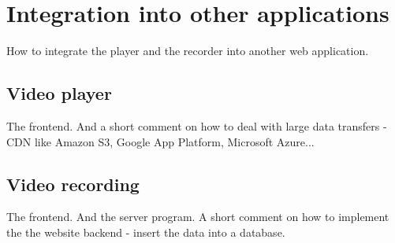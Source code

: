 \chapter{Integration into other applications}
How to integrate the player and the recorder into another web application.

\section{Video player}
The frontend. And a short comment on how to deal with large data transfers - CDN like Amazon S3, Google App Platform, Microsoft Azure...

\section{Video recording}
The frontend. And the server program. A short comment on how to implement the the website backend - insert the data into a database.
